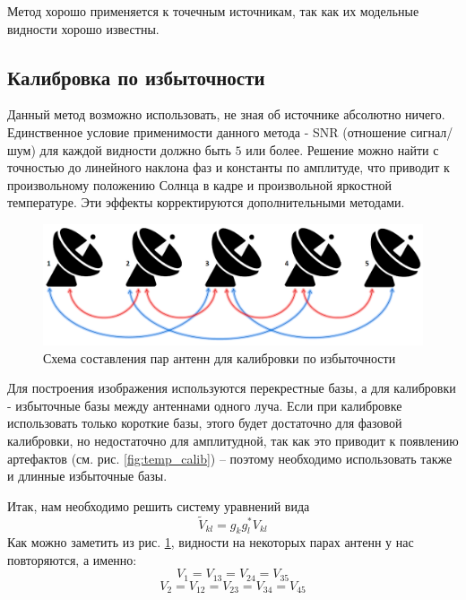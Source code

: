 Метод хорошо применяется к точечным источникам, так как их модельные видности хорошо известны.

\subsection{Калибровка по избыточности}
Данный метод возможно использовать, не зная об источнике абсолютно ничего. Единственное условие применимости данного метода - SNR (отношение сигнал/шум) для каждой видности должно быть $5$ или более. Решение можно найти с точностью до линейного наклона фаз и константы по амплитуде, что
приводит к произвольному положению Солнца в кадре и произвольной яркостной температуре. Эти
эффекты корректируются дополнительными методами.

\begin{figure}[H]
	\centering
	\includegraphics[scale=0.35]{images/calibrate_cheme.png}
	\caption{Схема составления пар антенн для калибровки по избыточности}
	\label{fig:калибровка по избыточности}
\end{figure}

Для построения изображения используются перекрестные базы, а для калибровки - избыточные базы между антеннами одного луча. Если при калибровке использовать только короткие базы, этого будет достаточно для фазовой калибровки, но недостаточно для амплитудной, так как это приводит к появлению артефактов (см. рис. \ref{fig:temp_calib}) -- поэтому необходимо использовать также и длинные избыточные базы.

Итак, нам необходимо решить систему уравнений вида
\begin{equation}\label{eq:калибровка по избыточности 1}
	\widetilde{V}_{kl} = g_kg_l^*V_{kl}
\end{equation}
Как можно заметить из рис. \ref{fig:калибровка по избыточности}, видности на некоторых парах антенн у нас повторяются, а именно:\\
\begin{equation}\label{eq:повторы баз 1}
	V_1 = V_{13} = V_{24} = V_{35}
\end{equation}
\begin{equation}\label{eq:повторы баз 2}
	V_2 = V_{12} = V_{23} = V_{34} = V_{45}
\end{equation}

